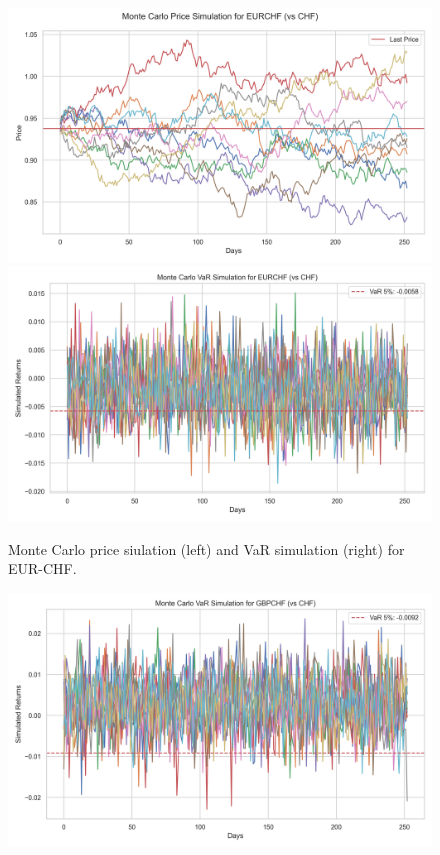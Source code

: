 \documentclass{article}
\begin{document}
\begin{figure}[H]
    \centering  \includegraphics[width=0.48\linewidth]{../../reports/figures/monte_carlo_price_simulation_EURCHF_vs_CHF.png} \label{fig:monte_carlo_price_simulation_EURCHF_vs_CHF}
    \includegraphics[width=0.48\linewidth]{../../reports/figures/monte_carlo_var_simulation_EURCHF_vs_CHF.png} \label{fig:monte_carlo_var_simulation_EURCHF_vs_CHF}
    \caption{\footnotesize Monte Carlo price siulation (left) and VaR simulation (right) for EUR-CHF.}
\end{figure}

\begin{figure}[H]
    \centering  \includegraphics[width=0.7\linewidth]{../../reports/figures/monte_carlo_var_simulation_GBPCHF_vs_CHF.png} \label{fig:monte_carlo_var_simulation_GBPCHF_vs_CHF}
\end{figure}

\printbibliography
\end{document}

